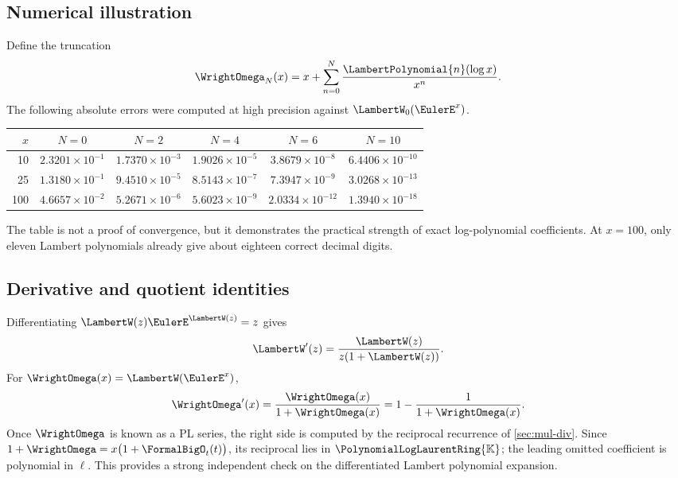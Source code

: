 \documentclass[11pt,oneside]{article}
\numberwithin{equation}{section}
\theoremstyle{definition}
\newcommand{\K}{\mathbb{K}}
\newcommand{\PL}{\PolynomialLogLaurentRing{\K}}
\begin{document}
\subsection{Numerical illustration}

Define the truncation
\begin{equation}\label{eq:omega-N}
  \WrightOmega_N(x)=x+\sum_{n=0}^N\frac{\LambertPolynomial{n}(\log x)}{x^n}.
\end{equation}
The following absolute errors were computed at high precision against
\(\LambertW_0(\EulerE^x)\).

\begin{center}
\begin{tabular}{@{}rccccc@{}}
\toprule
\(x\)&\(N=0\)&\(N=2\)&\(N=4\)&\(N=6\)&\(N=10\)\\
\midrule
10  &\(2.3201\!\times10^{-1}\)&\(1.7370\!\times10^{-3}\)&\(1.9026\!\times10^{-5}\)&\(3.8679\!\times10^{-8}\)&\(6.4406\!\times10^{-10}\)\\
25  &\(1.3180\!\times10^{-1}\)&\(9.4510\!\times10^{-5}\)&\(8.5143\!\times10^{-7}\)&\(7.3947\!\times10^{-9}\)&\(3.0268\!\times10^{-13}\)\\
100 &\(4.6657\!\times10^{-2}\)&\(5.2671\!\times10^{-6}\)&\(5.6023\!\times10^{-9}\)&\(2.0334\!\times10^{-12}\)&\(1.3940\!\times10^{-18}\)\\
\bottomrule
\end{tabular}
\end{center}

The table is not a proof of convergence, but it demonstrates the practical
strength of exact log-polynomial coefficients.  At \(x=100\), only eleven
Lambert polynomials already give about eighteen correct decimal digits.

\subsection{Derivative and quotient identities}

Differentiating \(\LambertW(z)\EulerE^{\LambertW(z)}=z\) gives
\begin{equation}\label{eq:W-derivative}
  \LambertW'(z)=\frac{\LambertW(z)}{z(1+\LambertW(z))}.
\end{equation}
For \(\WrightOmega(x)=\LambertW(\EulerE^x)\),
\begin{equation}\label{eq:omega-derivative}
  \WrightOmega'(x)=\frac{\WrightOmega(x)}{1+\WrightOmega(x)}
  =1-\frac{1}{1+\WrightOmega(x)}.
\end{equation}
Once \(\WrightOmega\) is known as a PL series, the right side is computed by the
reciprocal recurrence of \cref{sec:mul-div}.  Since
\(1+\WrightOmega=x\bigl(1+\FormalBigO_t(t)\bigr)\), its reciprocal lies in \(\PL\);
the leading omitted coefficient is polynomial in \(\ell\).
This provides a strong independent check on the differentiated Lambert
polynomial expansion.
\end{document}
